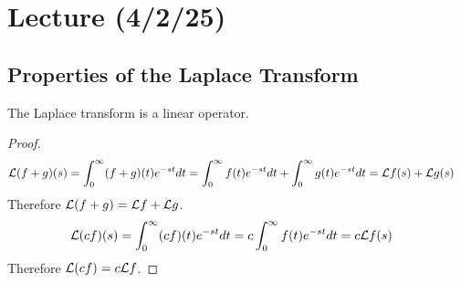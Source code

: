 \documentclass[notes]{subfiles}
\begin{document}
\setcounter{section}{16}
\section{Lecture (4/2/25)}

\subsection{Properties of the Laplace Transform}
\begin{lemma}
    The Laplace transform is a linear operator.
\end{lemma}
\begin{proof}
    \begin{align*}
        \mathcal{L} (f + g)(s)
        &= \int_0^\infty (f + g)(t)e^{-st}dt
        = \int_0^\infty f(t)e^{-st}dt + \int_0^\infty g(t)e^{-st}dt
        = \mathcal{L} f(s) + \mathcal{L} g(s)
    \end{align*}
    Therefore $\mathcal{L} (f + g) = \mathcal{L} f + \mathcal{L} g$.
    \begin{align*}
        \mathcal{L} (cf)(s)
        &= \int_0^\infty (cf)(t)e^{-st}dt
        = c\int_0^\infty f(t)e^{-st}dt
        = c\mathcal{L} f(s)
    \end{align*}
    Therefore $\mathcal{L} (cf) = c\mathcal{L} f$.
\end{proof}
\end{document}
